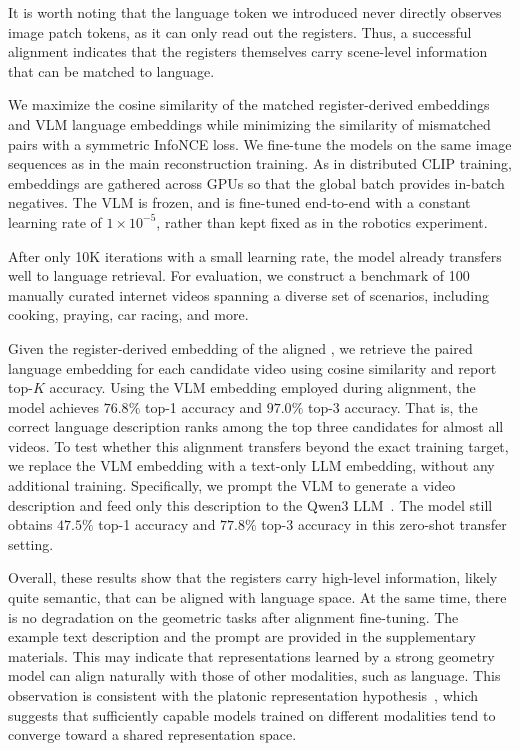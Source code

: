 It is worth noting that the language token we introduced never directly observes image patch tokens, as it can only read out the registers.
Thus, a successful alignment indicates that the registers themselves carry scene-level information that can be matched to language.

We maximize the cosine similarity of the matched register-derived embeddings and VLM language embeddings while minimizing the similarity of mismatched pairs with a symmetric InfoNCE loss.
We fine-tune the models on the same image sequences as in the main reconstruction training.
As in distributed CLIP training, embeddings are gathered across GPUs so that the global batch provides in-batch negatives.
The VLM is frozen, and \method is fine-tuned end-to-end with a constant learning rate of $1\times10^{-5}$, rather than kept fixed as in the robotics experiment.

After only 10K iterations with a small learning rate, the model already transfers well to language retrieval.
For evaluation, we construct a benchmark of 100 manually curated internet videos spanning a diverse set of scenarios, including cooking, praying, car racing, and more.

Given the register-derived embedding of the aligned \method, we retrieve the paired language embedding for each candidate video using cosine similarity and report top-$K$ accuracy.
Using the VLM embedding employed during alignment, the model achieves $76.8\%$ top-1 accuracy and $97.0\%$ top-3 accuracy.
That is, the correct language description ranks among the top three candidates for almost all videos.
To test whether this alignment transfers beyond the exact training target, we replace the VLM embedding with a text-only LLM embedding, without any additional training.
Specifically, we prompt the VLM to generate a video description and feed only this description to the Qwen3 LLM~\cite{yang25qwen3}.
The model still obtains $47.5\%$ top-1 accuracy and $77.8\%$ top-3 accuracy in this zero-shot transfer setting.

Overall, these results show that the registers carry high-level information, likely quite semantic, that can be aligned with language space.
At the same time, there is no degradation on the geometric tasks after alignment fine-tuning.
The example text description and the prompt are provided in the supplementary materials.
This may indicate that representations learned by a strong geometry model can align naturally with those of other modalities, such as language.
This observation is consistent with the platonic representation hypothesis~\cite{huh24position:,han25learning}, which suggests that sufficiently capable models trained on different modalities tend to converge toward a shared representation space.


